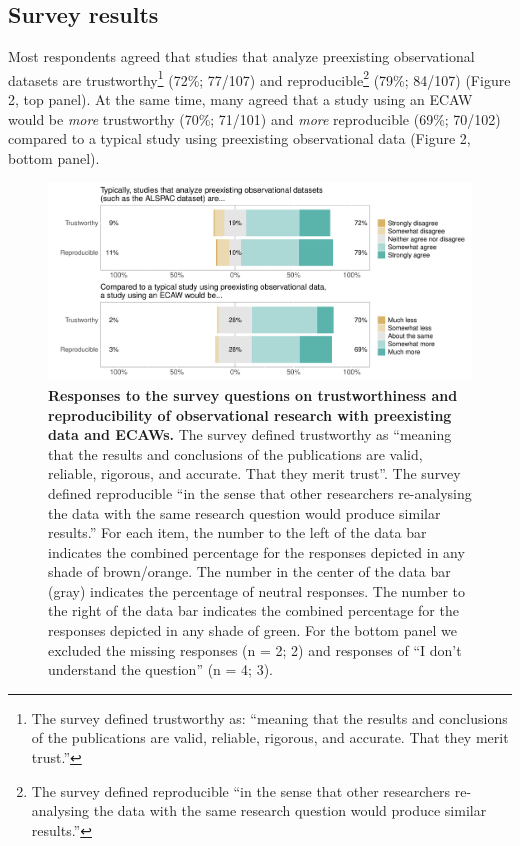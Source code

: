 \documentclass[
  man,floatsintext]{apa6}
\begin{document}
\hypertarget{survey-results}{%
\subsection{Survey results}\label{survey-results}}

Most respondents agreed that studies that analyze preexisting observational datasets are trustworthy\footnote{The survey defined trustworthy as: ``meaning that the results and conclusions of the publications are valid, reliable, rigorous, and accurate. That they merit trust.''} (72\%; 77/107) and reproducible\footnote{The survey defined reproducible ``in the sense that other researchers re-analysing the data with the same research question would produce similar results.''} (79\%; 84/107) (Figure 2, top panel). At the same time, many agreed that a study using an ECAW would be \emph{more} trustworthy (70\%; 71/101) and \emph{more} reproducible (69\%; 70/102) compared to a typical study using preexisting observational data (Figure 2, bottom panel).

\begin{figure}

{\centering \includegraphics[width=1\linewidth]{figs/typicallyEcawPlot-1} 

}

\caption{\textbf{Responses to the survey questions on trustworthiness and reproducibility of observational research with preexisting data and ECAWs.} The survey defined trustworthy as ``meaning that the results and conclusions of the publications are valid, reliable, rigorous, and accurate. That they merit trust''. The survey defined reproducible ``in the sense that other researchers re-analysing the data with the same research question would produce similar results.'' For each item, the number to the left of the data bar indicates the combined percentage for the responses depicted in any shade of brown/orange. The number in the center of the data bar (gray) indicates the percentage of neutral responses. The number to the right of the data bar indicates the combined percentage for the responses depicted in any shade of green. For the bottom panel we excluded the missing responses (n = 2; 2) and responses of ``I don't understand the question'' (n = 4; 3).}\label{fig:typicallyEcawPlot}
\end{figure}
\end{document}
